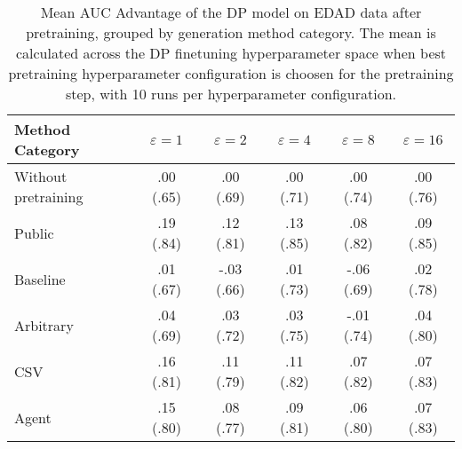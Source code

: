 \begin{table}[h!]
    \centering
    \caption{Mean AUC Advantage of the DP model on EDAD data after pretraining, grouped by generation method category. The mean is calculated across the DP finetuning hyperparameter space when best pretraining hyperparameter configuration is choosen for the pretraining step, with 10 runs per hyperparameter configuration.}
    \label{tab:epsilon_comparison}
    \begin{tabular}{lccccc}
    \toprule
    Method Category & $\varepsilon=1$ & $\varepsilon=2$ & $\varepsilon=4$ & $\varepsilon=8$ & $\varepsilon=16$ \\
    \midrule
    Without pretraining & .00 {\small (.65)} & .00 {\small (.69)} & .00 {\small (.71)} & .00 {\small (.74)} & .00 {\small (.76)} \\
    \arrayrulecolor{black!50!}\midrule
    Public & \cellcolor{gold!30}.19 {\small (.84)} & \cellcolor{gold!30}.12 {\small (.81)} & \cellcolor{gold!30}.13 {\small (.85)} & \cellcolor{gold!30}.08 {\small (.82)} & \cellcolor{gold!30}.09 {\small (.85)} \\
    \arrayrulecolor{black!50!}\midrule
    Baseline & .01 {\small (.67)} & -.03 {\small (.66)} & .01 {\small (.73)} & -.06 {\small (.69)} & .02 {\small (.78)} \\
    \arrayrulecolor{black!50!}\midrule
    Arbitrary & .04 {\small (.69)} & .03 {\small (.72)} & .03 {\small (.75)} & -.01 {\small (.74)} & .04 {\small (.80)} \\
    \arrayrulecolor{black!50!}\midrule
    CSV & \cellcolor{silver!30}.16 {\small (.81)} & \cellcolor{silver!30}.11 {\small (.79)} & \cellcolor{silver!30}.11 {\small (.82)} & \cellcolor{silver!30}.07 {\small (.82)} & \cellcolor{silver!30}.07 {\small (.83)} \\
    Agent & \cellcolor{bronze!30}.15 {\small (.80)} & \cellcolor{bronze!30}.08 {\small (.77)} & \cellcolor{bronze!30}.09 {\small (.81)} & \cellcolor{bronze!30}.06 {\small (.80)} & \cellcolor{bronze!30}.07 {\small (.83)} \\
    \bottomrule
    \end{tabular}
\end{table}